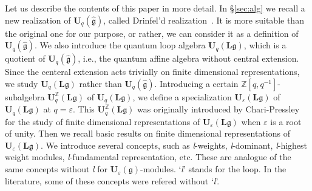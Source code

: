 \documentclass[12pt]{amsart}
\def\Bbb{\mathbb}
\theoremstyle{definition}
\theoremstyle{remark}
\numberwithin{equation}{subsection}
\newcommand{\secref}[1]{\S\ref{#1}}
\newcommand{\C}{{\Bbb C}}
\newcommand{\Z}{{\Bbb Z}}
\newcommand{\Ua}{{\mathbf U}_q(\widehat{\mathfrak g})} %
\newcommand{\Ul}{{\mathbf U}_q({\mathbf L}{\mathfrak g})} %
\newcommand{\Ue}{{\mathbf U}_{\varepsilon}(\mathfrak g)}
\newcommand{\Uli}{{\mathbf U}^{\Z}_q({\mathbf L}\mathfrak g)}
\newcommand{\Ule}{{\mathbf U}_{\varepsilon}({\mathbf L}\mathfrak g)}
\begin{document}

Let us describe the contents of this paper in more detail.
%
In \secref{sec:alg} we recall a new realization of $\Ua$, called
Drinfel'd realization~\cite{Drinfeld}.
%
It is more suitable than the original one for our purpose,
%
or rather, we can consider it as a definition of $\Ua$.
%
We also introduce the quantum loop algebra $\Ul$, which is a quotient
of $\Ua$, i.e., the quantum affine algebra without central
extension. Since the centeral extension acts trivially on finite
dimensional representations, we study $\Ul$ rather than $\Ua$.
%
Introducing a certain $\Z[q,q^{-1}]$-subalgebra $\Uli$ of $\Ul$, we
define a specialization $\Ule$ of $\Ul$ at $q = \varepsilon$.
%
This $\Uli$ was originally introduced by Chari-Pressley~\cite{CP3} for
the study of finite dimensional representations of $\Ule$ when
$\varepsilon$ is a root of unity.
%
Then we recall basic results on finite dimensional representations of
$\Ule$. We introduce several concepts, such as {\it l\/}-weights, {\it
l\/}-dominant, {\it l\/}-highest weight modules, {\it l\/}-fundamental
representation, etc. These are analogue of the same concepts without
{\it l\/} for $\Ue$-modules. `{\it l\/}' stands for the loop. In the
literature, some of these concepts were refered without `{\it l\/}'.
\end{document}
